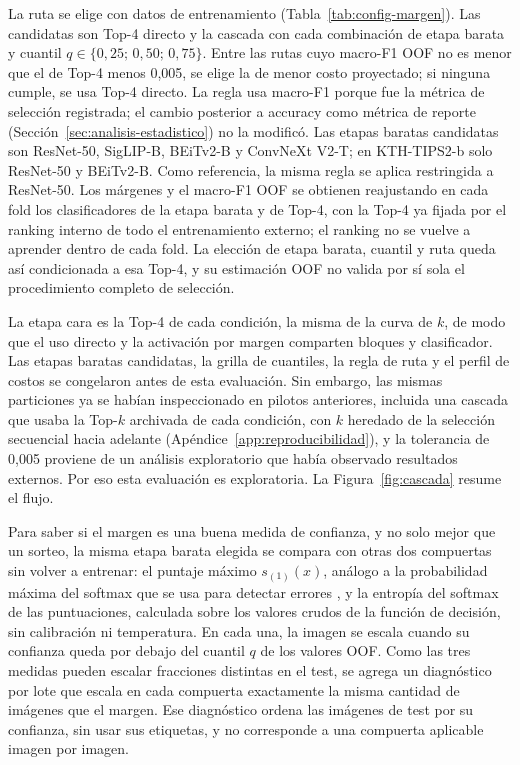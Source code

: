 \documentclass[a4paper,fleqn]{cas-sc}
\begin{document}
La ruta se elige con datos de entrenamiento (Tabla~\ref{tab:config-margen}). Las candidatas son Top-4 directo y la cascada con cada combinación de etapa barata y cuantil $q\in\{0{,}25;\,0{,}50;\,0{,}75\}$. Entre las rutas cuyo macro-F1 OOF no es menor que el de Top-4 menos 0,005, se elige la de menor costo proyectado; si ninguna cumple, se usa Top-4 directo. La regla usa macro-F1 porque fue la métrica de selección registrada; el cambio posterior a accuracy como métrica de reporte (Sección~\ref{sec:analisis-estadistico}) no la modificó. Las etapas baratas candidatas son ResNet-50, SigLIP-B, BEiTv2-B y ConvNeXt V2-T; en KTH-TIPS2-b solo ResNet-50 y BEiTv2-B. Como referencia, la misma regla se aplica restringida a ResNet-50. Los márgenes y el macro-F1 OOF se obtienen reajustando en cada fold los clasificadores de la etapa barata y de Top-4, con la Top-4 ya fijada por el ranking interno de todo el entrenamiento externo; el ranking no se vuelve a aprender dentro de cada fold. La elección de etapa barata, cuantil y ruta queda así condicionada a esa Top-4, y su estimación OOF no valida por sí sola el procedimiento completo de selección.

La etapa cara es la Top-4 de cada condición, la misma de la curva de $k$, de modo que el uso directo y la activación por margen comparten bloques y clasificador. Las etapas baratas candidatas, la grilla de cuantiles, la regla de ruta y el perfil de costos se congelaron antes de esta evaluación. Sin embargo, las mismas particiones ya se habían inspeccionado en pilotos anteriores, incluida una cascada que usaba la Top-$k$ archivada de cada condición, con $k$ heredado de la selección secuencial hacia adelante (Apéndice~\ref{app:reproducibilidad}), y la tolerancia de 0,005 proviene de un análisis exploratorio que había observado resultados externos. Por eso esta evaluación es exploratoria. La Figura~\ref{fig:cascada} resume el flujo.

Para saber si el margen es una buena medida de confianza, y no solo mejor que un sorteo, la misma etapa barata elegida se compara con otras dos compuertas sin volver a entrenar: el puntaje máximo $s_{(1)}(x)$, análogo a la probabilidad máxima del softmax que se usa para detectar errores \citep{hendrycks2017baseline}, y la entropía del softmax de las puntuaciones, calculada sobre los valores crudos de la función de decisión, sin calibración ni temperatura. En cada una, la imagen se escala cuando su confianza queda por debajo del cuantil $q$ de los valores OOF. Como las tres medidas pueden escalar fracciones distintas en el test, se agrega un diagnóstico por lote que escala en cada compuerta exactamente la misma cantidad de imágenes que el margen. Ese diagnóstico ordena las imágenes de test por su confianza, sin usar sus etiquetas, y no corresponde a una compuerta aplicable imagen por imagen.
\end{document}
